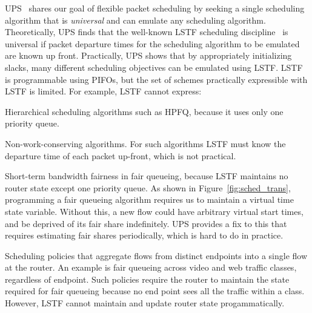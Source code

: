  UPS~\cite{ups} shares our goal of
flexible packet scheduling by seeking a single scheduling algorithm that is
{\em universal} and can emulate any scheduling algorithm. Theoretically, UPS
finds that the well-known LSTF scheduling discipline~\cite{lstf} is universal
if packet departure times for the scheduling algorithm to be emulated are known
up front. Practically, UPS shows that by appropriately initializing slacks, many different scheduling objectives can be
emulated using LSTF. LSTF is programmable using PIFOs, but the set of schemes
practically expressible with LSTF is limited. For example, LSTF cannot
express:
\begin{CompactEnumerate}
\item Hierarchical scheduling algorithms such as HPFQ, because it
  uses only one priority queue.
\item Non-work-conserving algorithms. For such algorithms LSTF must know the
  departure time of each packet up-front, which is not practical.
\item Short-term bandwidth fairness in fair queueing, because LSTF maintains no
  router state except one priority queue. As shown in
  Figure~\ref{fig:sched_trans}, programming a fair queueing algorithm requires us
  to maintain a virtual time state variable. Without this, a new flow could have
  arbitrary virtual start times, and be deprived of its fair share indefinitely.
  UPS provides a fix to this that requires
  estimating fair shares periodically, which is hard to do in
  practice.
\item Scheduling policies that aggregate flows from distinct endpoints into a
  single flow at the router. An example is fair queueing across video and web
  traffic classes, regardless of endpoint.  Such policies require the router to
  maintain the state required for fair queueing because no end point sees all the
  traffic within a class.  However, LSTF cannot maintain and update router state
  progammatically.
\end{CompactEnumerate}


